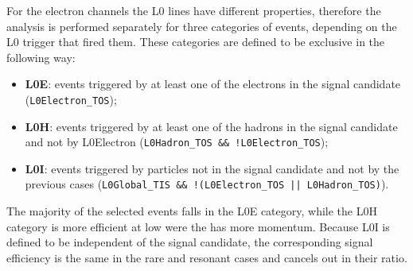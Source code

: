 For the electron channels the L0 lines have different properties, therefore the analysis 
is performed separately for three categories of events, depending on the L0 trigger that fired 
them. These categories are defined to be exclusive in the following way:
%
\begin{itemize}
\item {\bf L0E}: events triggered by at least one of the electrons in the signal candidate (\verb!L0Electron_TOS!);
\item {\bf L0H}: events triggered by at least one of the hadrons in the signal candidate and not by L0Electron (\verb|L0Hadron_TOS && !L0Electron_TOS|);
\item {\bf L0I}: events triggered by particles not in the signal candidate and not by the previous cases 
(\verb|L0Global_TIS && !(L0Electron_TOS |\verb!|| L0Hadron_TOS)!).
\end{itemize}

The majority of the selected events falls in the L0E category, while
the L0H category is more efficient at low \qsq were the \Kstarz has more momentum.
Because L0I is defined to be independent of the signal candidate, the corresponding
signal efficiency is the same in the rare and resonant cases and cancels out in their ratio.

